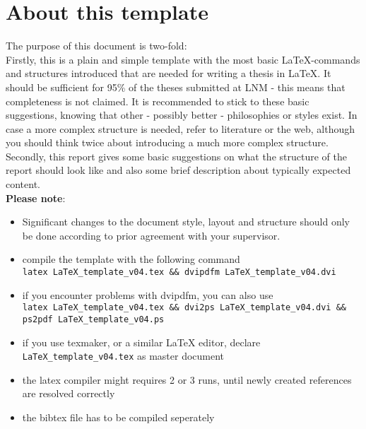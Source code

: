 \section{About this template}
\label{sec:about}

The purpose of this document is two-fold:\\
Firstly, this is a plain and simple template with the most basic \LaTeX-commands and
structures introduced that are
needed for writing a thesis in \LaTeX. It should be sufficient for 95\% of
the theses submitted at LNM - this means that completeness is not claimed. It is recommended to
stick to these basic suggestions, knowing that other - possibly better -
philosophies or styles exist. In case a more complex structure is needed, refer to literature or the web, although you should think
twice about introducing a much more complex structure. \\
Secondly, this report gives some basic suggestions on what the structure of the report should look like and also some brief description about typically expected content.\\

\textbf{Please note}: 
\begin{itemize}
 \item Significant changes to the document style, layout and structure should only be done according to prior agreement with your supervisor.
 \item compile the template with the following command \\
 \verb|latex LaTeX_template_v04.tex && dvipdfm LaTeX_template_v04.dvi|
 \item if you encounter problems with dvipdfm, you can also use \\
 \verb|latex LaTeX_template_v04.tex && dvi2ps LaTeX_template_v04.dvi &&|\\
 \verb|ps2pdf LaTeX_template_v04.ps| \\
 \item if you use texmaker, or a similar LaTeX editor, declare \verb|LaTeX_template_v04.tex| as master document   \\
 \item the latex compiler might requires 2 or 3 runs, until newly created references are resolved correctly \\
 \item the bibtex file has to be compiled seperately
\end{itemize}